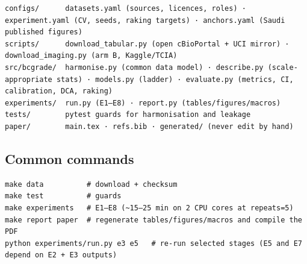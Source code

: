 \documentclass[
  10pt,
]{article}
\begin{document}
\begin{verbatim}
configs/      datasets.yaml (sources, licences, roles) · experiment.yaml (CV, seeds, raking targets) · anchors.yaml (Saudi published figures)
scripts/      download_tabular.py (open cBioPortal + UCI mirror) · download_imaging.py (arm B, Kaggle/TCIA)
src/bcgrade/  harmonise.py (common data model) · describe.py (scale-appropriate stats) · models.py (ladder) · evaluate.py (metrics, CI, calibration, DCA, raking)
experiments/  run.py (E1–E8) · report.py (tables/figures/macros)
tests/        pytest guards for harmonisation and leakage
paper/        main.tex · refs.bib · generated/ (never edit by hand)
\end{verbatim}

\hypertarget{common-commands}{%
\subsection{Common commands}\label{common-commands}}

\begin{verbatim}
make data          # download + checksum
make test          # guards
make experiments   # E1–E8 (~15–25 min on 2 CPU cores at repeats=5)
make report paper  # regenerate tables/figures/macros and compile the PDF
python experiments/run.py e3 e5   # re-run selected stages (E5 and E7 depend on E2 + E3 outputs)
\end{verbatim}
\end{document}
